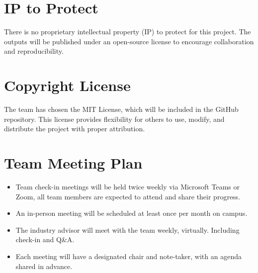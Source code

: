 \documentclass{article}
\begin{document}
\section{IP to Protect}


There is no proprietary intellectual property (IP) to protect for this project. 
The outputs will be published under an open-source license to encourage 
collaboration and reproducibility.

\section{Copyright License}


The team has chosen the MIT License, which will be included in the GitHub 
repository. This license provides flexibility for others to use, modify, 
and distribute the project with proper attribution.


\section{Team Meeting Plan}





\begin{itemize}
  \item Team check-in meetings will be held twice weekly via Microsoft Teams or Zoom, all team members are expected to attend
  and share their progress.
  \item An in-person meeting will be scheduled at least once per month on campus.
  \item The industry advisor will meet with the team weekly, virtually. Including check-in and Q&A.
  \item Each meeting will have a designated chair and note-taker, with an agenda shared in advance.
\end{itemize}
\end{document}
